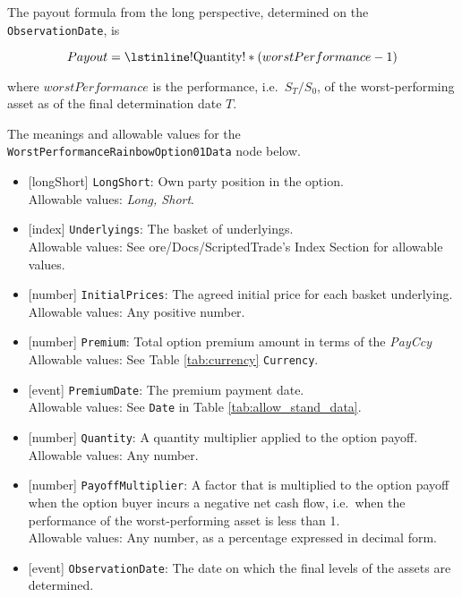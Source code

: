 The payout formula from the long perspective, determined on the \lstinline!ObservationDate!, is

\begin{equation*}
  Payout = \text{\lstinline!Quantity!} * (worstPerformance - 1)
\end{equation*}

where $worstPerformance$ is the performance, i.e.\ $S_T/S_0$, of the worst-performing asset as of the
final determination date $T$.

The meanings and allowable values for the \lstinline!WorstPerformanceRainbowOption01Data! node below.

\begin{itemize} 
  \item{}[longShort] \lstinline!LongShort!: Own party position in the option. \\
  Allowable values: \emph{Long, Short}.
  \item{}[index] \lstinline!Underlyings!: The basket of underlyings. \\
  Allowable values: See ore/Docs/ScriptedTrade's Index Section for allowable values.
  \item{}[number] \lstinline!InitialPrices!: The agreed initial price for each basket underlying. \\
  Allowable values: Any positive number.
  \item{}[number] \lstinline!Premium!: Total option premium amount in terms of the \emph{PayCcy} \\
  Allowable values: See Table \ref{tab:currency} \lstinline!Currency!.
  \item{}[event] \lstinline!PremiumDate!: The premium payment date. \\
  Allowable values: See \lstinline!Date! in Table \ref{tab:allow_stand_data}.
  \item{}[number] \lstinline!Quantity!: A quantity multiplier applied to the option payoff. \\
  Allowable values: Any number.
  \item{}[number] \lstinline!PayoffMultiplier!: A factor that is multiplied to the option payoff when the option buyer incurs a negative net cash flow, i.e.\ when the performance of the worst-performing asset is less than 1. \\
  Allowable values: Any number, as a percentage expressed in decimal form.
  \item{}[event] \lstinline!ObservationDate!: The date on which the final levels of the assets are determined. \\

\end{itemize}
